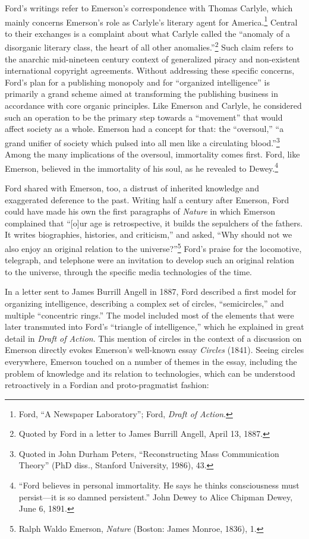 \documentclass[twoside,symmetric,nobib,justified]{tufte-book}
\begin{document}
Ford's writings refer to Emerson's correspondence with Thomas Carlyle,
which mainly concerns Emerson's role as Carlyle's literary agent for
America.\footnote{Ford, ``A Newspaper Laboratory''; Ford, \emph{Draft of
  Action}.} Central to their exchanges is a complaint about what Carlyle
called the ``anomaly of a disorganic literary class, the heart of all
other anomalies.''\footnote{Quoted by Ford in a letter to James Burrill
  Angell, April 13, 1887.} Such claim refers to the anarchic
mid-nineteen century context of generalized piracy and non-existent
international copyright agreements. Without addressing these specific
concerns, Ford's plan for a publishing monopoly and for ``organized
intelligence'' is primarily a grand scheme aimed at transforming the
publishing business in accordance with core organic principles. Like
Emerson and Carlyle, he considered such an operation to be the primary
step towards a ``movement'' that would affect society as a whole.
Emerson had a concept for that: the ``oversoul,'' ``a grand unifier of
society which pulsed into all men like a circulating blood.''\footnote{Quoted
  in John Durham Peters, ``Reconstructing Mass Communication Theory''
  (PhD diss., Stanford University, 1986), 43.} Among the many
implications of the oversoul, immortality comes first. Ford, like
Emerson, believed in the immortality of his soul, as he revealed to
Dewey.\footnote{``Ford believes in personal immortality. He says he
  thinks consciousness must persist---it is so damned persistent.'' John
  Dewey to Alice Chipman Dewey, June 6, 1891.}

Ford shared with Emerson, too, a distrust of inherited knowledge and
exaggerated deference to the past. Writing half a century after Emerson,
Ford could have made his own the first paragraphs of \emph{Nature} in
which Emerson complained that ``{[}o{]}ur age is retrospective, it
builds the sepulchers of the fathers. It writes biographies, histories,
and criticism,'' and asked, ``Why should not we also enjoy an original
relation to the universe?''\footnote{Ralph Waldo Emerson, \emph{Nature}
  (Boston: James Monroe, 1836), 1.} Ford's praise for the locomotive,
telegraph, and telephone were an invitation to develop such an original
relation to the universe, through the specific media technologies of the
time.

In a letter sent to James Burrill Angell in 1887, Ford described a first
model for organizing intelligence, describing a complex set of circles,
``semicircles,'' and multiple ``concentric rings.'' The model included
most of the elements that were later transmuted into Ford's ``triangle
of intelligence,'' which he explained in great detail in \emph{Draft of
Action}. This mention of circles in the context of a discussion on
Emerson directly evokes Emerson's well-known essay \emph{Circles}
(1841). Seeing circles everywhere, Emerson touched on a number of themes
in the essay, including the problem of knowledge and its relation to
technologies, which can be understood retroactively in a Fordian and
proto-pragmatist fashion:
\end{document}

